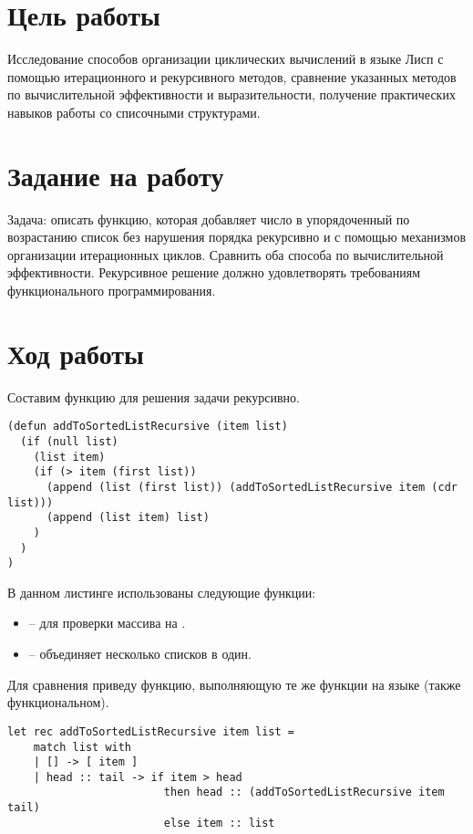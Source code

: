 \documentclass[a4paper,14pt]{extarticle}
\begin{document}


\section{Цель работы}
Исследование способов организации циклических вычислений в языке Лисп с помощью
итерационного и рекурсивного методов, сравнение указанных методов по
вычислительной эффективности и выразительности, получение практических навыков
работы со списочными структурами.

\section{Задание на работу}
Задача: описать функцию, которая добавляет число в упорядоченный по возрастанию
список без нарушения порядка рекурсивно и с помощью механизмов организации
итерационных циклов. Сравнить оба способа по вычислительной эффективности.
Рекурсивное решение должно удовлетворять требованиям функционального
программирования.

\section{Ход работы}
Составим функцию для решения задачи рекурсивно.

\begin{lstlisting}
(defun addToSortedListRecursive (item list)
  (if (null list)
    (list item)
    (if (> item (first list))
      (append (list (first list)) (addToSortedListRecursive item (cdr list)))
      (append (list item) list)
    )
  )
)
\end{lstlisting}

В данном листинге использованы следующие функции:
\begin{itemize}
    \item {} -- для проверки массива на .
    \item {} -- объединяет несколько списков в один.
\end{itemize}

Для сравнения приведу функцию, выполняющую те же функции на языке 
(также функциональном).

\begin{lstlisting}
let rec addToSortedListRecursive item list =
    match list with
    | [] -> [ item ]
    | head :: tail -> if item > head
                        then head :: (addToSortedListRecursive item tail)
                        else item :: list
\end{lstlisting}
\end{document}

